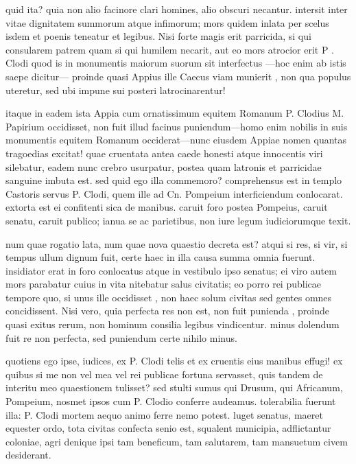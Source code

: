  quid ita? quia non alio facinore clari homines, alio obscuri necantur. intersit inter vitae dignitatem summorum atque infimorum; mors quidem inlata per scelus isdem et poenis teneatur et legibus. Nisi forte magis erit parricida, si qui consularem patrem quam si qui humilem necarit, aut eo mors atrocior erit P . Clodi quod is in monumentis maiorum suorum sit interfectus —hoc enim ab istis saepe dicitur— proinde quasi Appius ille Caecus viam munierit , non qua populus uteretur, sed ubi impune sui posteri latrocinarentur!

 itaque in eadem ista Appia cum ornatissimum equitem Romanum P. Clodius M. Papirium occidisset, non fuit illud facinus puniendum—homo enim nobilis in suis monumentis equitem Romanum occiderat—nunc eiusdem Appiae nomen quantas tragoedias excitat! quae cruentata antea caede honesti atque innocentis viri silebatur, eadem nunc crebro usurpatur, postea quam latronis et parricidae sanguine imbuta est. sed quid ego illa commemoro? comprehensus est in templo Castoris servus P. Clodi, quem ille ad Cn. Pompeium interficiendum conlocarat. extorta est ei confitenti sica de manibus. caruit foro postea Pompeius, caruit senatu, caruit publico; ianua se ac parietibus, non iure legum iudiciorumque texit.

 num quae rogatio lata, num quae nova quaestio decreta est? atqui si res, si vir, si tempus ullum dignum fuit, certe haec in illa causa summa omnia fuerunt. insidiator erat in foro conlocatus atque in vestibulo ipso senatus; ei viro autem mors parabatur cuius in vita nitebatur salus civitatis; eo porro rei publicae tempore quo, si unus ille occidisset , non haec solum civitas sed gentes omnes concidissent. Nisi vero, quia perfecta res non est, non fuit punienda , proinde quasi exitus rerum, non hominum consilia legibus vindicentur. minus dolendum fuit re non perfecta, sed puniendum certe nihilo minus.

 quotiens ego ipse, iudices, ex P. Clodi telis et ex cruentis eius manibus effugi! ex quibus si me non vel mea vel rei publicae fortuna servasset, quis tandem de interitu meo quaestionem tulisset? sed stulti sumus qui Drusum, qui Africanum, Pompeium, nosmet ipsos cum P. Clodio conferre audeamus. tolerabilia fuerunt illa: P. Clodi mortem aequo animo ferre nemo potest. luget senatus, maeret equester ordo, tota civitas confecta senio est, squalent municipia, adflictantur coloniae, agri denique ipsi tam beneficum, tam salutarem, tam mansuetum civem desiderant.

